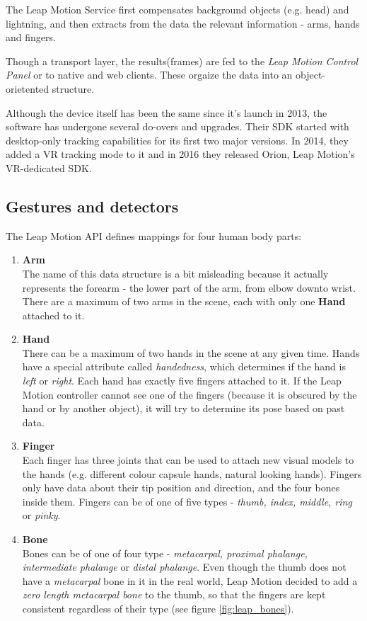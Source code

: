 \documentclass[12pt,a4paper,twoside]{report}
\begin{document}
The Leap Motion Service first compensates background objects (e.g. head) and lightning, and then extracts from the data the relevant information - arms, hands and fingers.

Though a transport layer, the results(frames) are fed to the \textit{Leap Motion Control Panel} or to native and web clients. These orgaize the data into an object-orietented structure.

Although the device itself has been the same since it's launch in 2013, the software has undergone several do-overs and upgrades. Their SDK started with desktop-only tracking capabilities for its first two major versions. In 2014, they added a VR tracking mode to it and in 2016 they released Orion, Leap Motion's VR-dedicated SDK.


\subsection{Gestures and detectors}

The Leap Motion API \cite{LMAPI} defines mappings for four human body parts:\cite{LMAPI}

\begin{enumerate}
  \item \textbf{Arm} \\
    The name of this data structure is a bit misleading because it actually represents the forearm - the lower part of the arm, from elbow downto wrist. There are a maximum of two arms in the scene, each with only one \textbf{Hand} attached to it.
  \item \textbf{Hand} \\
    There can be a maximum of two hands in the scene at any given time. Hands have a special attribute called \textit{handedness}, which determines if the hand is \textit{left} or \textit{right}. Each hand has exactly five fingers attached to it. If the Leap Motion controller cannot see one of the fingers (because it is obscured by the hand or by another object), it will try to determine its pose based on past data.
  \item \textbf{Finger} \\
    Each finger has three joints that can be used to attach new visual models to the hands (e.g. different colour capsule hands, natural looking hands). Fingers only have data about their tip position and direction, and the four bones inside them. Fingers can be of one of five types - \textit{thumb, index, middle, ring} or \textit{pinky}.
  \item \textbf{Bone} \\
    Bones can be of one of four type - \textit{metacarpal, proximal phalange, intermediate phalange} or \textit{distal phalange}. Even though the thumb does not have a \textit{metacarpal} bone in it in the real world, Leap Motion decided to add a \textit{zero length metacarpal bone} to the thumb, so that the fingers are kept consistent regardless of their type (see figure \ref{fig:leap_bones}).
\end{enumerate}
\end{document}
